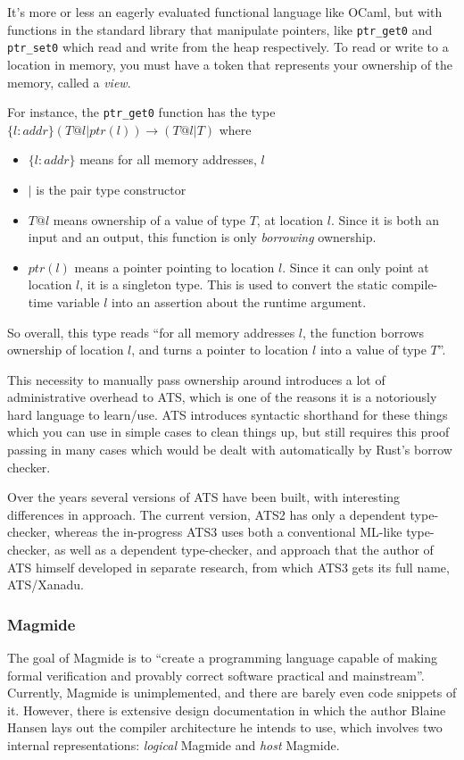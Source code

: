 \documentclass[12pt,twoside]{report}
\begin{document}
It's more or less an eagerly evaluated functional language like OCaml, but with functions in the standard library that manipulate pointers, like \verb|ptr_get0| and \verb|ptr_set0| which read and write from the heap respectively. To read or write to a location in memory, you must have a token that represents your ownership of the memory, called a \textit{view}.

For instance, the \verb|ptr_get0| function has the type $\{l:addr\} (T @ l | ptr (l)) \rightarrow (T @ l | T)$ where
\begin{itemize}
  \item $\{l:addr\}$ means for all memory addresses, $l$
  \item $|$ is the pair type constructor
  \item $T @ l$ means ownership of a value of type $T$, at location $l$. Since it is both an input and an output, this function is only \textit{borrowing} ownership.
  \item $ptr(l)$ means a pointer pointing to location $l$. Since it can only point at location $l$, it is a singleton type. This is used to convert the static compile-time variable $l$ into an assertion about the runtime argument.
\end{itemize}


So overall, this type reads ``for all memory addresses $l$, the function borrows ownership of location $l$, and turns a pointer to location $l$ into a value of type $T$''.

This necessity to manually pass ownership around introduces a lot of administrative overhead to ATS, which is one of the reasons it is a notoriously hard language to learn/use. ATS introduces syntactic shorthand for these things which you can use in simple cases to clean things up, but still requires this proof passing in many cases which would be dealt with automatically by Rust's borrow checker.

Over the years several versions of ATS have been built, with interesting differences in approach. The current version, ATS2 has only a dependent type-checker, whereas the in-progress ATS3 uses both a conventional ML-like type-checker, as well as a dependent type-checker, and approach that the author of ATS himself developed in separate research, from which ATS3 gets its full name, ATS/Xanadu.

\subsubsection{Magmide}
The goal of Magmide \citep{noauthor_magmidemagmide_2024} is to ``create a programming language capable of making formal verification and provably correct software practical and mainstream''. Currently, Magmide is unimplemented, and there are barely even code snippets of it. However, there is extensive design documentation in which the author Blaine Hansen lays out the compiler architecture he intends to use, which involves two internal representations: \textit{logical} Magmide and \textit{host} Magmide.
\end{document}
